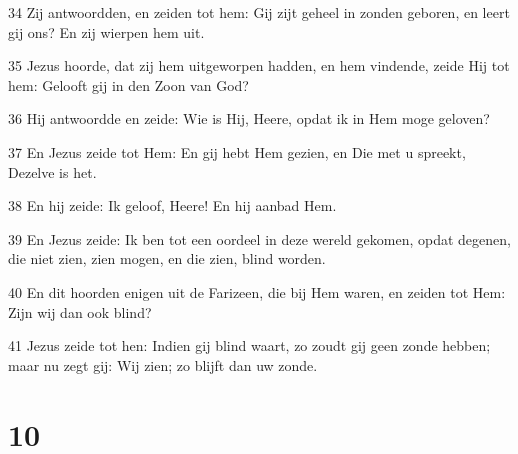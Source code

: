 \par 34 Zij antwoordden, en zeiden tot hem: Gij zijt geheel in zonden geboren, en leert gij ons? En zij wierpen hem uit.
\par 35 Jezus hoorde, dat zij hem uitgeworpen hadden, en hem vindende, zeide Hij tot hem: Gelooft gij in den Zoon van God?
\par 36 Hij antwoordde en zeide: Wie is Hij, Heere, opdat ik in Hem moge geloven?
\par 37 En Jezus zeide tot Hem: En gij hebt Hem gezien, en Die met u spreekt, Dezelve is het.
\par 38 En hij zeide: Ik geloof, Heere! En hij aanbad Hem.
\par 39 En Jezus zeide: Ik ben tot een oordeel in deze wereld gekomen, opdat degenen, die niet zien, zien mogen, en die zien, blind worden.
\par 40 En dit hoorden enigen uit de Farizeen, die bij Hem waren, en zeiden tot Hem: Zijn wij dan ook blind?
\par 41 Jezus zeide tot hen: Indien gij blind waart, zo zoudt gij geen zonde hebben; maar nu zegt gij: Wij zien; zo blijft dan uw zonde.

\chapter{10}

